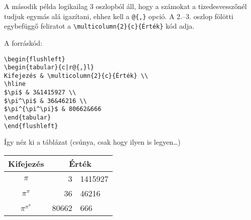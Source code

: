 \documentclass[a4paper]{article}
\begin{document}
A második példa logikailag 3 oszlopból áll, hogy a számokat a tizedesvesszőnél tudjuk egymás alá igazítani, ehhez kell a \verb!@{,}! opció. A 2.--3. oszlop fölötti egybefüggő feliratot a \verb!\multicolumn{2}{c}{Érték}! kód adja.


A forráskód:

\begin{verbatim}
\begin{flushleft}
\begin{tabular}{c|r@{,}l}
Kifejezés & \multicolumn{2}{c}{Érték} \\
\hline
$\pi$ & 3&1415927 \\
$\pi^\pi$ & 36&46216 \\
$\pi^{\pi^\pi}$ & 80662&666
\end{tabular}
\end{flushleft}
\end{verbatim}

Így néz ki a táblázat (csúnya, csak hogy ilyen is legyen\dots)

\begin{flushleft} %
	\begin{tabular}{c|r@{,}l}
		Kifejezés & \multicolumn{2}{c}{Érték} \\
		\hline
		$\pi$ & 3&1415927 \\
		$\pi^\pi$ & 36&46216 \\
		$\pi^{\pi^\pi}$ & 80662&666
	\end{tabular}
\end{flushleft}
\end{document}
